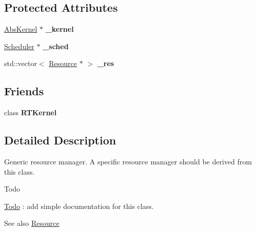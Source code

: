 \subsection*{Protected Attributes}
\begin{DoxyCompactItemize}
\item 
\hyperlink{classRTSim_1_1AbsKernel}{Abs\+Kernel} $\ast$ {\bfseries \+\_\+kernel}\hypertarget{classRTSim_1_1ResManager_a1b6b985a9e3ad16383d7f2069f723100}{}\label{classRTSim_1_1ResManager_a1b6b985a9e3ad16383d7f2069f723100}

\item 
\hyperlink{classRTSim_1_1Scheduler}{Scheduler} $\ast$ {\bfseries \+\_\+sched}\hypertarget{classRTSim_1_1ResManager_a6158a46f8bd6b90d60f4077ad5727f9d}{}\label{classRTSim_1_1ResManager_a6158a46f8bd6b90d60f4077ad5727f9d}

\item 
std\+::vector$<$ \hyperlink{classRTSim_1_1Resource}{Resource} $\ast$ $>$ {\bfseries \+\_\+res}\hypertarget{classRTSim_1_1ResManager_a39b6e52aa3e4c42435d40f9000073f3b}{}\label{classRTSim_1_1ResManager_a39b6e52aa3e4c42435d40f9000073f3b}

\end{DoxyCompactItemize}
\subsection*{Friends}
\begin{DoxyCompactItemize}
\item 
class {\bfseries R\+T\+Kernel}\hypertarget{classRTSim_1_1ResManager_aecc1e2b2cf8a3e2fdb93474b4d657bdf}{}\label{classRTSim_1_1ResManager_aecc1e2b2cf8a3e2fdb93474b4d657bdf}

\end{DoxyCompactItemize}


\subsection{Detailed Description}
Generic resource manager. A specific resource manager should be derived from this class.

\begin{DoxyRefDesc}{Todo}
\item[\hyperlink{todo__todo000007}{Todo}]\+: add simple documentation for this class.\end{DoxyRefDesc}


\begin{DoxySeeAlso}{See also}
\hyperlink{classRTSim_1_1Resource}{Resource} 
\end{DoxySeeAlso}


